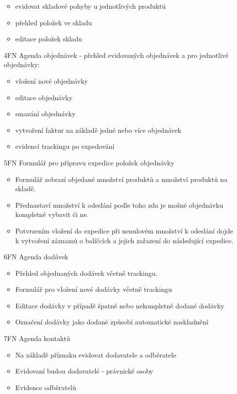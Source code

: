 \documentclass[thesis=B,czech]{FITthesis}[2012/06/26]
\begin{document}
\begin{enumerate}
		\begin{itemize}
			\item evidovat skladové pohyby u jednotlivých produktů
			\item přehled položek ve skladu
			\item editace položek skladu
		\end{itemize}
	\item[4FN] Agenda objednávek - přehled evidovaných objednávek a pro jednotlivé objednávky:
	\begin{itemize}
		\item vložení nové objednávky
		\item editace objednávky
		\item smazání objednávky
		\item vytvoření faktur na základě jedné nebo více objednávek
		\item evidencí trackingu po expedování
	\end{itemize}
	\item[5FN] Formulář pro přípravu expedice položek objednávky
	\begin{itemize}
		\item Formulář zobrazí objedané množství produktů a množství produktů na skladě. 
		\item Přednastaví množství k odeslání podle toho zda je možné objednávku kompletně vybavit či ne.
		\item Potvrzením vložení do expedice při nenulovém množství k odeslání dojde k vytvoření záznamů o balíčcích a jejich zařazení do následující expedice.
	\end{itemize}
	\item[6FN] Agenda dodávek
	\begin{itemize}
		\item Přehled objednaných dodávek včetně trackingu.
		\item Formulář pro vložení nové dodávky včetně trackingu
		\item Editace dodávky v případě špatně nebo nekompletně dodané dodávky
		\item Označení dodávky jako dodané způsobí automatické naskladnění
	\end{itemize}
	\item[7FN] Agenda kontaktů
	\begin{itemize}
		\item Na základě příznaku evidovat dodavatele a odběratele
		\item Evidovaní budou dodavatelé - právnické osoby
		\item Evidence odběratelů

\end{itemize}
\end{enumerate}
\end{document}
